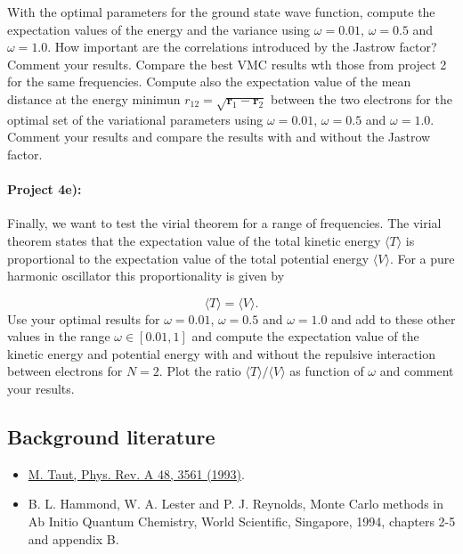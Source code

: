 \documentclass[%
oneside,                 %
final,                   %
10pt]{article}
\begin{document}
With the optimal parameters for the ground state wave function, compute the expectation values of the  energy and the variance using $\omega=0.01$,
  $\omega=0.5$ and $\omega=1.0$. How important are the correlations introduced by the Jastrow factor? Comment your results. Compare the best VMC results wth those from project 2 for the same frequencies.  Compute also the expectation value of the mean distance at the energy minimun 
  $r_{12}=\sqrt{\mathbf{r}_1-\mathbf{r}_2}$ between the two electrons for the optimal set of the variational parameters using $\omega=0.01$,
  $\omega=0.5$ and $\omega=1.0$.  Comment your results and compare the results with and without the Jastrow factor.

\paragraph{Project 4e):}
Finally, we want to test the virial theorem for a range of frequencies. The virial theorem states that the expectation value of the total kinetic energy $\langle T \rangle$ is proportional to the expectation value of the total potential energy $\langle V \rangle$. For a pure harmonic oscillator this proportionality is given by

\begin{equation*}
  \langle T \rangle= \langle V \rangle.
  \end{equation*}
  Use your optimal results for $\omega=0.01$,
  $\omega=0.5$ and $\omega=1.0$ and add to these other values in the range  $\omega\in [0.01,1]$
  and   compute the expectation value of the kinetic energy and potential energy with and without the
  repulsive interaction between electrons for $N=2$. Plot the
  ratio $\langle T \rangle/\langle V \rangle$ as function of
  $\omega$ and comment your results.

\subsection*{Background literature}

\begin{itemize}
   \item \href{{http://journals.aps.org/pra/abstract/10.1103/PhysRevA.48.3561}}{M. Taut, Phys. Rev. A 48, 3561 (1993)}.

   \item B. L. Hammond, W. A. Lester and P. J. Reynolds, Monte Carlo methods   in Ab Initio Quantum Chemistry, World Scientific, Singapore, 1994, chapters   2-5 and appendix B.
\end{itemize}
\end{document}
